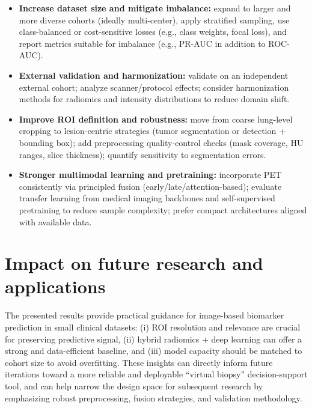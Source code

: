 \documentclass[twoside,runningheads,a4paper,11pt]{report}
\begin{document}
\begin{itemize}
    \item \textbf{Increase dataset size and mitigate imbalance:}
    expand to larger and more diverse cohorts (ideally multi-center), apply stratified sampling, use class-balanced or cost-sensitive losses (e.g., class weights, focal loss), and report metrics suitable for imbalance (e.g., PR-AUC in addition to ROC-AUC).

    \item \textbf{External validation and harmonization:}
    validate on an independent external cohort; analyze scanner/protocol effects; consider harmonization methods for radiomics and intensity distributions to reduce domain shift.

    \item \textbf{Improve ROI definition and robustness:}
    move from coarse lung-level cropping to lesion-centric strategies (tumor segmentation or detection + bounding box); add preprocessing quality-control checks (mask coverage, HU ranges, slice thickness); quantify sensitivity to segmentation errors.

    \item \textbf{Stronger multimodal learning and pretraining:}
    incorporate PET consistently via principled fusion (early/late/attention-based); evaluate transfer learning from medical imaging backbones and self-supervised pretraining to reduce sample complexity; prefer compact architectures aligned with available data.

\end{itemize}

\section{Impact on future research and applications}
The presented results provide practical guidance for image-based biomarker prediction in small clinical datasets: (i) ROI resolution and relevance are crucial for preserving predictive signal, (ii) hybrid radiomics + deep learning can offer a strong and data-efficient baseline, and (iii) model capacity should be matched to cohort size to avoid overfitting. These insights can directly inform future iterations toward a more reliable and deployable ``virtual biopsy'' decision-support tool, and can help narrow the design space for subsequent research by emphasizing robust preprocessing, fusion strategies, and validation methodology.




\end{document}
